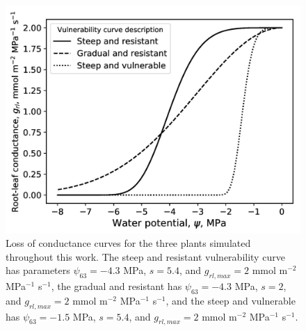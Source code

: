 \documentclass[utf8]{frontiersSCNS} %
\begin{document}
\begin{figure}[h]
    \begin{center}
         \includegraphics[scale=0.75]{grl.jpg}   
    \end{center}
    \caption{Loss of conductance curves for the three plants simulated throughout this work. The steep and resistant vulnerability curve has parameters $\psi_{63} = -4.3$ MPa, $s=5.4$, and $g_{rl,max} = 2$ mmol m$^{-2}$ MPa$^{-1}$ s$^{-1}$, the gradual and resistant has $\psi_{63} = -4.3$ MPa, $s=2$, and $g_{rl,max} = 2$ mmol m$^{-2}$ MPa$^{-1}$ s$^{-1}$, and the steep and vulnerable has $\psi_{63} = -1.5$ MPa, $s=5.4$, and $g_{rl,max} = 2$ mmol m$^{-2}$ MPa$^{-1}$ s$^{-1}$.}
    \label{fig:grl}
\end{figure}
\end{document}
